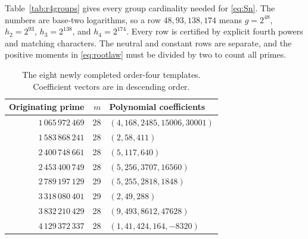 \documentclass[11pt]{article}
\theoremstyle{definition}\newtheorem{definition}[theorem]{Definition}
\begin{document}
Table~\ref{tab:r4groups} gives every group cardinality needed for
\eqref{eq:Sn}. The numbers are base-two logarithms, so a row
$48,93,138,174$ means $g=2^{48}$, $h_2=2^{93}$,
$h_3=2^{138}$, and $h_4=2^{174}$. Every row is certified by
explicit fourth powers and matching characters. The neutral and
constant rows are separate, and the positive moments in
\eqref{eq:rootlaw} must be divided by two to count all primes.
\begin{table}[!htbp]\centering\small\setlength{\tabcolsep}{4pt}
\caption{The eight newly completed order-four templates. Coefficient vectors are in descending order.}\label{tab:r4poly}
\begin{tabular}{rrl}
\toprule
Originating prime & $m$ & Polynomial coefficients \\
\midrule
$1\,065\,972\,469$ & 28 & $(4,168,2485,15006,30001)$ \\
$1\,583\,868\,241$ & 28 & $(2,58,411)$ \\
$2\,400\,748\,661$ & 28 & $(5,117,640)$ \\
$2\,453\,400\,749$ & 28 & $(5,256,3707,16560)$ \\
$2\,789\,197\,129$ & 29 & $(5,255,2818,1848)$ \\
$3\,318\,080\,401$ & 29 & $(2,49,288)$ \\
$3\,832\,210\,429$ & 28 & $(9,493,8612,47628)$ \\
$4\,129\,372\,337$ & 28 & $(1,41,424,164,-8320)$ \\
\bottomrule\end{tabular}\end{table}
\end{document}
